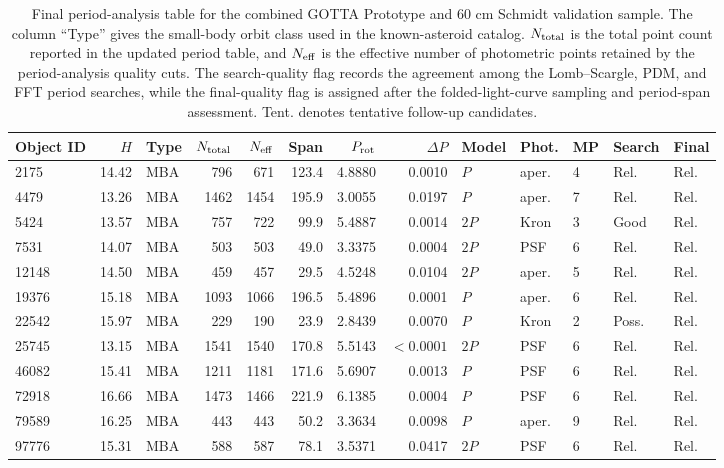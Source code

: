 \begin{table}[!p]
\centering
\caption{Final period-analysis table for the combined GOTTA Prototype and 60 cm Schmidt validation sample. The column ``Type'' gives the small-body orbit class used in the known-asteroid catalog. $N_{\rm total}$ is the total point count reported in the updated period table, and $N_{\rm eff}$ is the effective number of photometric points retained by the period-analysis quality cuts. The search-quality flag records the agreement among the Lomb--Scargle, PDM, and FFT period searches, while the final-quality flag is assigned after the folded-light-curve sampling and period-span assessment. Tent. denotes tentative follow-up candidates.}
\label{tab:period_results}
\scriptsize
\setlength{\tabcolsep}{2.6pt}
\renewcommand{\arraystretch}{1.12}
\begin{tabular}{lrlrrrrrlllll}
\toprule
Object ID & $H$ & Type & $N_{\rm total}$ & $N_{\rm eff}$ & Span & $P_{\rm rot}$ & $\Delta P$ & Model & Phot. & MP & Search & Final \\
\midrule
2175 & 14.42 & MBA & 796 & 671 & 123.4 & 4.8880 & 0.0010 & $P$ & aper. & 4 & Rel. & Rel. \\
4479 & 13.26 & MBA & 1462 & 1454 & 195.9 & 3.0055 & 0.0197 & $P$ & aper. & 7 & Rel. & Rel. \\
5424 & 13.57 & MBA & 757 & 722 & 99.9 & 5.4887 & 0.0014 & $2P$ & Kron & 3 & Good & Rel. \\
7531 & 14.07 & MBA & 503 & 503 & 49.0 & 3.3375 & 0.0004 & $2P$ & PSF & 6 & Rel. & Rel. \\
12148 & 14.50 & MBA & 459 & 457 & 29.5 & 4.5248 & 0.0104 & $2P$ & aper. & 5 & Rel. & Rel. \\
19376 & 15.18 & MBA & 1093 & 1066 & 196.5 & 5.4896 & 0.0001 & $P$ & aper. & 6 & Rel. & Rel. \\
22542 & 15.97 & MBA & 229 & 190 & 23.9 & 2.8439 & 0.0070 & $P$ & Kron & 2 & Poss. & Rel. \\
25745 & 13.15 & MBA & 1541 & 1540 & 170.8 & 5.5143 & $<0.0001$ & $2P$ & PSF & 6 & Rel. & Rel. \\
46082 & 15.41 & MBA & 1211 & 1181 & 171.6 & 5.6907 & 0.0013 & $P$ & PSF & 6 & Rel. & Rel. \\
72918 & 16.66 & MBA & 1473 & 1466 & 221.9 & 6.1385 & 0.0004 & $P$ & PSF & 6 & Rel. & Rel. \\
79589 & 16.25 & MBA & 443 & 443 & 50.2 & 3.3634 & 0.0098 & $P$ & aper. & 9 & Rel. & Rel. \\
97776 & 15.31 & MBA & 588 & 587 & 78.1 & 3.5371 & 0.0417 & $2P$ & PSF & 6 & Rel. & Rel. \\

\end{tabular}
\end{table}
